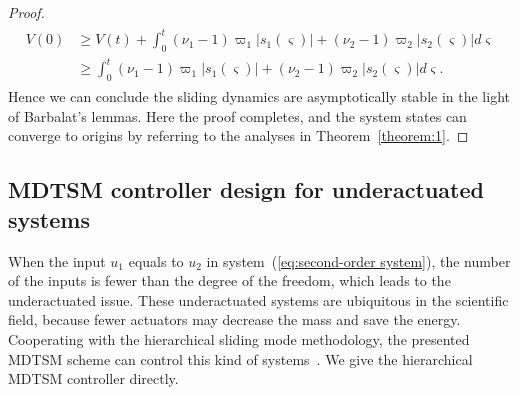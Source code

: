 \documentclass[3p]{elsarticle}
\theoremstyle{plain}
\theoremstyle{remark}
\begin{document}
{\begin{proof}
\begin{align}\begin{split}
V(0)&\ge V(t)+\int_0^t(\nu_1-1)\varpi_1\vert s_1(\varsigma)\vert+(\nu_2-1)\varpi_2\vert s_2(\varsigma)\vert d\varsigma\\
&\ge\int_0^t(\nu_1-1)\varpi_1\vert s_1(\varsigma)\vert+(\nu_2-1)\varpi_2\vert s_2(\varsigma)\vert d\varsigma.
\end{split}\end{align}
Hence we can conclude the sliding dynamics are asymptotically stable in the light of Barbalat’s lemmas. Here the proof completes, and the system states can converge to origins by referring to the analyses in Theorem~\ref{theorem:1}.
\end{proof}
}
\subsection{MDTSM controller design for underactuated systems}
When the input $u_1$ equals to $u_2$ in system~(\ref{eq:second-order system}), the number of the inputs is fewer than the degree of the freedom, which leads to the underactuated issue. These underactuated systems are ubiquitous in the scientific field, because fewer actuators may decrease the mass and save the energy. Cooperating with the hierarchical sliding mode methodology, the presented MDTSM scheme can control this kind of systems~\cite{wang2004design}. We give the hierarchical MDTSM controller directly.
\end{document}
